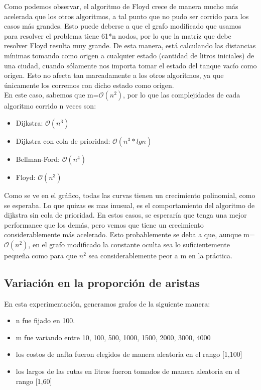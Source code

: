 Como podemos observar, el algoritmo de Floyd crece de manera mucho más acelerada que los otros algoritmos, a tal punto que no pudo ser corrido para los casos más grandes. Esto puede deberse a que el grafo modificado que usamos para resolver el problema tiene 61*n nodos, por lo que la matríz que debe resolver Floyd resulta muy grande. De esta manera, está calculando las distancias mínimas tomando como origen a cualquier estado (cantidad de litros iniciales) de una ciudad, cuando sólamente nos importa tomar el estado del tanque vacío como origen. Esto no afecta tan marcadamente a los otros algoritmos, ya que únicamente los corremos con dicho estado como origen. \\
\indent En este caso, sabemos que m=$\mathcal{O}(n^{2})$, por lo que las complejidades de cada algoritmo corrido n veces son:
\begin{itemize}
\item Dijkstra: $\mathcal{O}(n^{3})$
\item Dijkstra con cola de prioridad: $\mathcal{O}(n^{3}*lgn)$
\item Bellman-Ford: $\mathcal{O}(n^{4})$
\item Floyd: $\mathcal{O}(n^{3})$
\end{itemize}

Como se ve en el gráfico, todas las curvas tienen un crecimiento polinomial, como se esperaba. Lo que quizas es mas inusual, es el comportamiento del algoritmo de dijkstra sin cola de prioridad. En estos casos, se esperaría que tenga una mejor performance que los demás, pero vemos que tiene un crecimiento considerablemente más acelerado. Esto probablemente se deba a que, aunque m=$\mathcal{O}(n^{2})$, en el grafo modificado la constante oculta sea lo suficientemente pequeña como para que $n^{2}$ sea considerablemente peor a m en la práctica.

\subsection{Variación en la proporción de aristas}
En esta experimentación, generamos grafos de la siguiente manera: \\
\begin{itemize}
\item n fue fijado en 100.
\item m fue variando entre 10, 100, 500, 1000, 1500, 2000, 3000, 4000
\item los costos de nafta fueron elegidos de manera aleatoria en el rango [1,100]
\item los largos de las rutas en litros fueron tomados de manera aleatoria en el rango [1,60]
\end{itemize}

